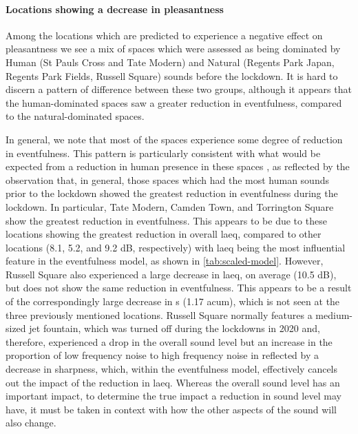    \paragraph{Locations showing a decrease in pleasantness} Among the locations which are predicted to experience a negative effect on pleasantness we see a mix of spaces which were assessed as being dominated by Human (St Pauls Cross and Tate Modern) and Natural (Regents Park Japan, Regents Park Fields, Russell Square) sounds before the lockdown. It is hard to discern a pattern of difference between these two groups, although it appears that the human-dominated spaces saw a greater reduction in eventfulness, compared to the natural-dominated spaces.

   In general, we note that most of the spaces experience some degree of reduction in eventfulness. This pattern is particularly consistent with what would be expected from a reduction in human presence in these spaces \citep{Aletta2018Towards}, as reflected by the observation that, in general, those spaces which had the most human sounds prior to the lockdown showed the greatest reduction in eventfulness during the lockdown. In particular, Tate Modern, Camden Town, and Torrington Square show the greatest reduction in eventfulness. This appears to be due to these locations showing the greatest reduction in overall \gls{laeq}, compared to other locations (8.1, 5.2, and 9.2 dB, respectively) with \gls{laeq} being the most influential feature in the eventfulness model, as shown in \cref{tab:scaled-model}. However, Russell Square also experienced a large decrease in \gls{laeq}, on average (10.5 dB), but does not show the same reduction in eventfulness. This appears to be a result of the correspondingly large decrease in \gls{s} (1.17 acum), which is not seen at the three previously mentioned locations. Russell Square normally features a medium-sized jet fountain, which was turned off during the lockdowns in 2020 and, therefore, experienced a drop in the overall sound level but an increase in the proportion of low frequency noise to high frequency noise in reflected by a decrease in sharpness, which, within the eventfulness model, effectively cancels out the impact of the reduction in \gls{laeq}. Whereas the overall sound level has an important impact, to determine the true impact a reduction in sound level may have, it must be taken in context with how the other aspects of the sound will also change. 

